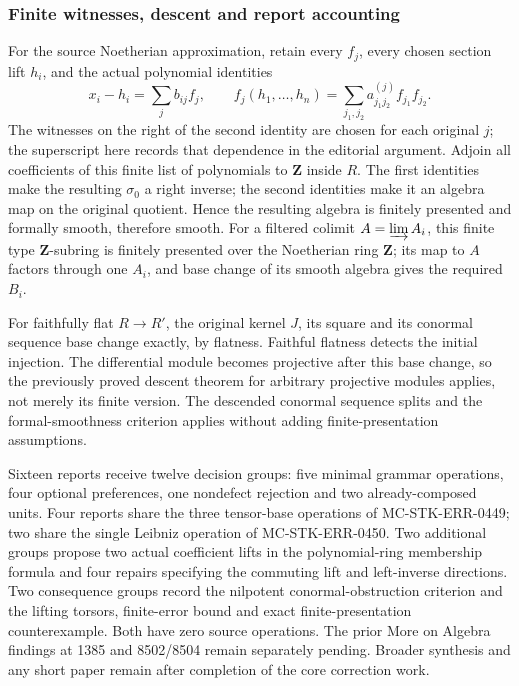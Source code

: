\subsubsection{Finite witnesses, descent and report accounting}\label{algebra-proof-048-finite-witnesses-descent-and-report-accounting}

For the source Noetherian approximation, retain every \(f_j\), every chosen section lift \(h_i\), and the actual polynomial identities \[
x_i-h_i=\sum_j b_{ij}f_j,\qquad
f_j(h_1,\ldots,h_n)=\sum_{j_1,j_2}a^{(j)}_{j_1j_2}f_{j_1}f_{j_2}.
\] The witnesses on the right of the second identity are chosen for each original \(j\); the superscript here records that dependence in the editorial argument. Adjoin all coefficients of this finite list of polynomials to \(\mathbf Z\) inside \(R\). The first identities make the resulting \(\sigma_0\) a right inverse; the second identities make it an algebra map on the original quotient. Hence the resulting algebra is finitely presented and formally smooth, therefore smooth. For a filtered colimit \(A=\varinjlim A_i\), this finite type \(\mathbf Z\)-subring is finitely presented over the Noetherian ring \(\mathbf Z\); its map to \(A\) factors through one \(A_i\), and base change of its smooth algebra gives the required \(B_i\).

For faithfully flat \(R\to R'\), the original kernel \(J\), its square and its conormal sequence base change exactly, by flatness. Faithful flatness detects the initial injection. The differential module becomes projective after this base change, so the previously proved descent theorem for arbitrary projective modules applies, not merely its finite version. The descended conormal sequence splits and the formal-smoothness criterion applies without adding finite-presentation assumptions.

Sixteen reports receive twelve decision groups: five minimal grammar operations, four optional preferences, one nondefect rejection and two already-composed units. Four reports share the three tensor-base operations of MC-\AlgebraIdentifierBreak{}STK-\AlgebraIdentifierBreak{}ERR-\AlgebraIdentifierBreak{}0449; two share the single Leibniz operation of MC-\AlgebraIdentifierBreak{}STK-\AlgebraIdentifierBreak{}ERR-\AlgebraIdentifierBreak{}0450. Two additional groups propose two actual coefficient lifts in the polynomial-ring membership formula and four repairs specifying the commuting lift and left-inverse directions. Two consequence groups record the nilpotent conormal-obstruction criterion and the lifting torsors, finite-error bound and exact finite-presentation counterexample. Both have zero source operations. The prior More on Algebra findings at 1385 and 8502/8504 remain separately pending. Broader synthesis and any short paper remain after completion of the core correction work.
